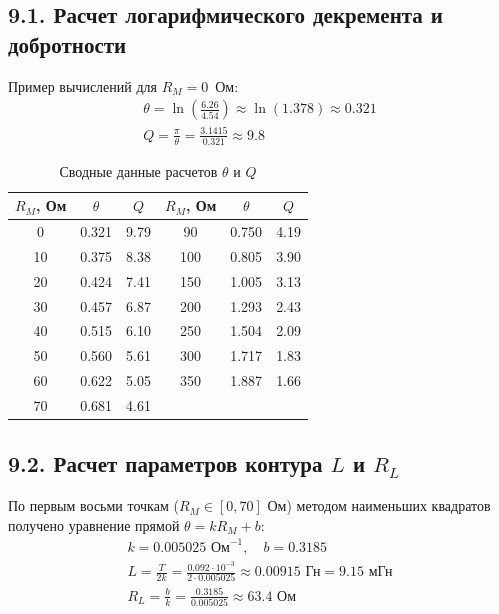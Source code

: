 \documentclass[a4paper,12pt]{article}
\begin{document}
\subsection*{9.1. Расчет логарифмического декремента и добротности}
Пример вычислений для $R_M = 0$~Ом:
\begin{gather*}
    \theta = \ln\left(\frac{6.26}{4.54}\right) \approx \ln(1.378) \approx 0.321 \\
    Q = \frac{\pi}{\theta} = \frac{3.1415}{0.321} \approx 9.8
\end{gather*}

\begin{table}[H]
    \centering
    \caption{Сводные данные расчетов $\theta$ и $Q$}
    \begin{tabular}{|c|c|c||c|c|c|}
        \hline
        $R_M$, Ом & $\theta$ & $Q$ & $R_M$, Ом & $\theta$ & $Q$ \\ \hline
        0   & 0.321 & 9.79 & 90  & 0.750 & 4.19 \\ \hline
        10  & 0.375 & 8.38 & 100 & 0.805 & 3.90 \\ \hline
        20  & 0.424 & 7.41 & 150 & 1.005 & 3.13 \\ \hline
        30  & 0.457 & 6.87 & 200 & 1.293 & 2.43 \\ \hline
        40  & 0.515 & 6.10 & 250 & 1.504 & 2.09 \\ \hline
        50  & 0.560 & 5.61 & 300 & 1.717 & 1.83 \\ \hline
        60  & 0.622 & 5.05 & 350 & 1.887 & 1.66 \\ \hline
        70  & 0.681 & 4.61 & \multicolumn{3}{c|}{} \\ \hline
    \end{tabular}
\end{table}

\subsection*{9.2. Расчет параметров контура $L$ и $R_L$}
По первым восьми точкам ($R_M \in [0, 70]$ Ом) методом наименьших квадратов получено уравнение прямой $\theta = k R_M + b$:
\begin{gather*}
    k = 0.005025 \text{ Ом}^{-1}, \quad b = 0.3185 \\
    L = \frac{T}{2k} = \frac{0.092 \cdot 10^{-3}}{2 \cdot 0.005025} \approx 0.00915 \text{ Гн} = 9.15 \text{ мГн} \\
    R_L = \frac{b}{k} = \frac{0.3185}{0.005025} \approx 63.4 \text{ Ом}
\end{gather*}
\end{document}
